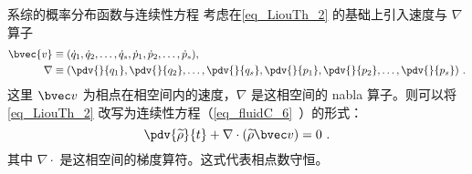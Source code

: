 \begin{corollary}{系综的概率分布函数与连续性方程}
考虑在\autoref{eq_LiouTh_2} 的基础上引入速度与 $\nabla$ 算子
\begin{equation}
\begin{aligned}
\bvec{v} &\equiv (\dot q_1, \dot q_2, \dots, \dot q_s, \dot p_1, \dot p_2, \dots, \dot p_s), \\
\nabla &\equiv (\pdv{}{q_1}, \pdv{}{q_2}, \dots, \pdv{}{q_s}, \pdv{}{p_1}, \pdv{}{p_2}, \dots, \pdv{}{p_s}) ~.
\end{aligned}
\end{equation}
这里 $\bvec v$ 为相点在相空间内的速度，$\nabla$ 是这相空间的 nabla 算子。则可以将\autoref{eq_LiouTh_2} 改写为连续性方程（\autoref{eq_fluidC_6}~）的形式：
\begin{equation}
\pdv{\widetilde \rho}{t} + \nabla \cdot \left(  \widetilde \rho \bvec v\right) = 0 ~.
\end{equation}
其中 $\nabla \cdot$ 是这相空间的梯度算符。这式代表相点数守恒。
\end{corollary}

